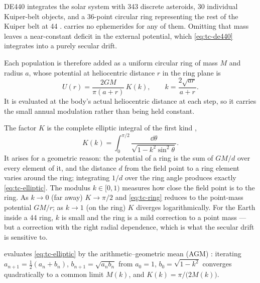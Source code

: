DE440 integrates the solar system with 343 discrete asteroids, 30 individual
Kuiper-belt objects, and a 36-point circular ring representing the rest of the
Kuiper belt at \SI{44}{\au} \citep{park2021de440}. \lupnt{} carries no
ephemerides for any of them. Omitting that mass leaves a near-constant deficit
in the external potential, which \cref{eq:tc-de440} integrates into a purely
secular drift.

Each population is therefore added as a uniform circular ring of mass $M$ and
radius $a$, whose potential at heliocentric distance $r$ in the ring plane is
%
\begin{equation}
\label{eq:tc-ring}
  U(r) = \frac{2GM}{\pi(a+r)}\,K(k),
  \qquad k = \frac{2\sqrt{ar}}{a+r} .
\end{equation}
%
It is evaluated at the body's actual heliocentric distance at each step, so it
carries the small annual modulation rather than being held constant.

The factor $K$ is the complete elliptic integral of the first kind
\citep[Ch.~17]{abramowitz1964},
%
\begin{equation}
\label{eq:tc-elliptic}
  K(k) = \int_{0}^{\pi/2} \frac{\dd\theta}{\sqrt{1 - k^{2}\sin^{2}\theta}} .
\end{equation}
%
It arises for a geometric reason: the potential of a ring is the sum of $GM/d$
over every element of it, and the distance $d$ from the field point to a ring
element varies around the ring; integrating $1/d$ over the ring angle produces
exactly \cref{eq:tc-elliptic}. The modulus $k \in [0,1)$ measures how close the
field point is to the ring. As $k \to 0$ (far away) $K \to \pi/2$ and
\cref{eq:tc-ring} reduces to the point-mass potential $GM/r$; as $k \to 1$ (on
the ring) $K$ diverges logarithmically. For the Earth inside a \SI{44}{\au}
ring, $k$ is small and the ring is a mild correction to a point mass --- but a
correction with the right radial dependence, which is what the secular drift is
sensitive to.

\lupnt{} evaluates \cref{eq:tc-elliptic} by the arithmetic--geometric mean
(AGM) \citep[\S17.6]{abramowitz1964}: iterating
$a_{n+1} = \tfrac{1}{2}(a_n + b_n)$, $b_{n+1} = \sqrt{a_n b_n}$ from $a_0 = 1$,
$b_0 = \sqrt{1-k^{2}}$ converges quadratically to a common limit $M(k)$, and
$K(k) = \pi / \bigl(2 M(k)\bigr)$.

